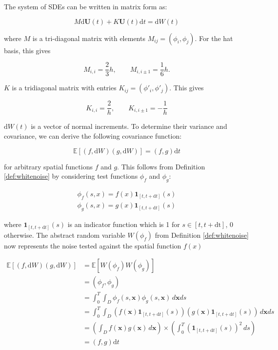 The system of SDEs can be written in matrix form as:

\begin{equation}\label{eq:fe_sdes_system}
    M \mathrm{d}\mathbf{U}(t) + K \mathbf{U}(t)\mathrm{d}t = \mathrm{d}W(t)
\end{equation}

where $M$ is a tri-diagonal matrix with elements $M_{ij} = (\phi_i, \phi_j)$. 
For the hat basis, this gives

\begin{equation*}
    M_{i,i} = \frac{2}{3}h, \qquad M_{i, i\pm 1} = \frac{1}{6}h.
\end{equation*}

$K$ is a tridiagonal matrix with entries $K_{ij} =(\phi'_i, \phi'_j)$. This gives

\begin{equation*}
    K_{i,i} = \frac{2}{h}, \qquad K_{i, i\pm 1} = - \frac{1}{h}
\end{equation*}

$\mathrm{d}W(t)$ is a vector of normal increments. To determine their variance and covariance, 
we can derive the following covariance function:

\begin{equation*}
    \mathbb{E}[(f, \mathrm{d}W)(g, \mathrm{d}W)] = (f,g) \mathrm{d}t
\end{equation*}

for arbitrary spatial functions $f$ and $g$. This follows from Definition \ref{def:whitenoise}
by considering test functions $\phi_f$ and $\phi_g$:

\begin{align*}
    \phi_f(s,x) = f(x)\mathbf{1}_{[t, t+\mathrm{d}t]}(s)\\
    \phi_g(s,x) = g(x)\mathbf{1}_{[t, t+\mathrm{d}t]}(s)
\end{align*}

where $\mathbf{1}_{[t, t+\mathrm{d}t]}(s)$ is an indicator function which is 1 for
$s \in [t, t + \mathrm{dt}]$, $0$ otherwise. The abstract random variable 
$W(\phi_f)$ from Definition \ref{def:whitenoise} now represents the noise tested 
against the spatial function $f(x)$


\begin{align*} 
    \mathbb{E}[(f, \mathrm{d}W)(g, \mathrm{d}W)] &= \mathbb{E}[W(\phi_f)W(\phi_g)] \\ 
    &= (\phi_f, \phi_g) \\ &= \int_0^T \int_D \phi_f(s, \mathbf{x}) \phi_g(s, \mathbf{x})
     \,d\mathbf{x}ds \\ &= \int_0^T \int_D \left( f(\mathbf{x}) \mathbf{1}_{[t, t+\mathrm{d}t]}(s) \right) 
     \left( g(\mathbf{x}) \mathbf{1}_{[t, t+\mathrm{d}t]}(s) \right) \,d\mathbf{x}ds \\
    &= \left( \int_D f(\mathbf{x})g(\mathbf{x})\,d\mathbf{x} \right)
     \times \left( \int_0^T (\mathbf{1}_{[t, t+\mathrm{d}t]}(s))^2 \,ds \right)  \\
    &= \left(f,g\right) \mathrm{d}t
\end{align*} 


